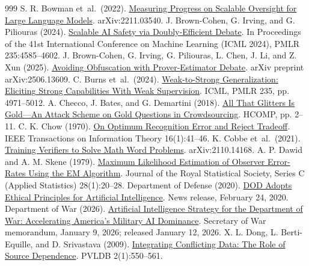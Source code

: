 \documentclass[12pt,letterpaper]{article}
\begin{document}
\begin{thebibliography}{999}
 S. R. Bowman et~al.\ (2022). \href{https://arxiv.org/abs/2211.03540}{Measuring Progress on Scalable Oversight for Large Language Models}. arXiv:2211.03540.
 J. Brown-Cohen, G. Irving, and G. Piliouras (2024). \href{https://proceedings.mlr.press/v235/brown-cohen24a.html}{Scalable AI Safety via Doubly-Efficient Debate}. In Proceedings of the 41st International Conference on Machine Learning (ICML 2024), PMLR 235:4585--4602.
 J. Brown-Cohen, G. Irving, G. Piliouras, L. Chen, J. Li, and Z. Xun (2025). \href{https://arxiv.org/abs/2506.13609}{Avoiding Obfuscation with Prover-Estimator Debate}. arXiv preprint arXiv:2506.13609.
 C. Burns et~al.\ (2024). \href{https://proceedings.mlr.press/v235/burns24b.html}{Weak-to-Strong Generalization: Eliciting Strong Capabilities With Weak Supervision}. ICML, PMLR 235, pp. 4971--5012.
 A. Checco, J. Bates, and G. Demartini (2018). \href{https://doi.org/10.1609/hcomp.v6i1.13332}{All That Glitters Is Gold---An Attack Scheme on Gold Questions in Crowdsourcing}. HCOMP, pp. 2--11.
 C. K. Chow (1970). \href{https://doi.org/10.1109/TIT.1970.1054406}{On Optimum Recognition Error and Reject Tradeoff}. IEEE Transactions on Information Theory 16(1):41--46.
 K. Cobbe et~al.\ (2021). \href{https://arxiv.org/abs/2110.14168}{Training Verifiers to Solve Math Word Problems}. arXiv:2110.14168.
 A. P. Dawid and A. M. Skene (1979). \href{https://doi.org/10.2307/2346806}{Maximum Likelihood Estimation of Observer Error-Rates Using the EM Algorithm}. Journal of the Royal Statistical Society, Series C (Applied Statistics) 28(1):20--28.
 Department of Defense (2020). \href{https://www.defense.gov/News/Releases/Release/Article/2091996/dod-adopts-ethical-principles-for-artificial-intelligence/}{DOD Adopts Ethical Principles for Artificial Intelligence}. News release, February 24, 2020.
 Department of War (2026). \href{https://www.war.gov/News/Releases/Release/Article/4376420/}{Artificial Intelligence Strategy for the Department of War: Accelerating America's Military AI Dominance}. Secretary of War memorandum, January 9, 2026; released January 12, 2026.
 X. L. Dong, L. Berti-Equille, and D. Srivastava (2009). \href{https://doi.org/10.14778/1687627.1687689}{Integrating Conflicting Data: The Role of Source Dependence}. PVLDB 2(1):550--561.

\end{thebibliography}
\end{document}
